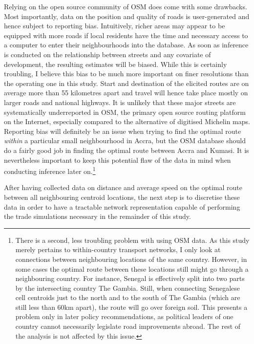 \documentclass[11pt, oneside]{article}   	%
\begin{document}
Relying on the open source community of OSM does come with some drawbacks. Most importantly, data on the position and quality of roads is user-generated and hence subject to reporting bias. Intuitively, richer areas may appear to be equipped with more roads if local residents have the time and necessary access to a computer to enter their neighbourhoods into the database. As soon as inference is conducted on the relationship between streets and any covariate of development, the resulting estimates will be biased. While this is certainly troubling, I believe this bias to be much more important on finer resolutions than the operating one in this study. Start and destination of the elicited routes are on average more than 55 kilometres apart and travel will hence take place mostly on larger roads and national highways. It is unlikely that these major streets are systematically underreported in OSM, the primary open source routing platform on the Internet, especially compared to the alternative of digitised Michelin maps. Reporting bias will definitely be an issue when trying to find the optimal route \emph{within} a particular small neighbourhood in Accra, but the OSM database should do a fairly good job in finding the optimal route between Accra and Kumasi. It is nevertheless important to keep this potential flaw of the data in mind when conducting inference later on.\footnote{There is a second, less troubling problem with using OSM data. As this study merely pertains to within-country transport networks, I only look at connections between neighbouring locations of the same country. However, in some cases the optimal route between these locations still might go through a neighbouring country. For instance, Senegal is effectively split into two parts by the intersecting country The Gambia. Still, when connecting Senegalese cell centroids just to the north and to the south of The Gambia (which are still less than 60km apart), the route will go over foreign soil. This presents a problem only in later policy recommendations, as political leaders of one country cannot necessarily legislate road improvements abroad. The rest of the analysis is not affected by this issue.}

After having collected data on distance and average speed on the optimal route between all neighbouring centroid locations, the next step is to discretise these data in order to have a tractable network representation capable of performing the trade simulations necessary in the remainder of this study.
\end{document}
